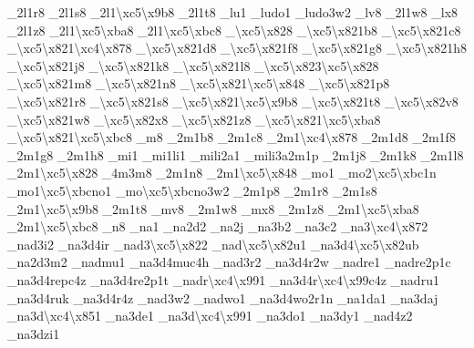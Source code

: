 {\-\_\-2l1r8 \-\_\-2l1s8 \-\_\-2l1\textbackslash{}xc5\textbackslash{}x9b8 \-\_\-2l1t8 \-\_\-lu1 \-\_\-ludo1 \-\_\-ludo3w2 \-\_\-lv8 \-\_\-2l1w8 \-\_\-lx8 \-\_\-2l1z8 \-\_\-2l1\textbackslash{}xc5\textbackslash{}xba8 \-\_\-2l1\textbackslash{}xc5\textbackslash{}xbc8 \-\_\-\textbackslash{}xc5\textbackslash{}x828 \-\_\textbackslash{}xc5\textbackslash{}x821b8 \-\_\textbackslash{}xc5\textbackslash{}x821c8 \-\_\textbackslash{}xc5\textbackslash{}x821\textbackslash{}xc4\textbackslash{}x878 \-\_\textbackslash{}xc5\textbackslash{}x821d8 \-\_\textbackslash{}xc5\textbackslash{}x821f8 \-\_\textbackslash{}xc5\textbackslash{}x821g8 \-\_\textbackslash{}xc5\textbackslash{}x821h8 \-\_\textbackslash{}xc5\textbackslash{}x821j8 \-\_\textbackslash{}xc5\textbackslash{}x821k8 \-\_\textbackslash{}xc5\textbackslash{}x821l8 \-\_\textbackslash{}xc5\textbackslash{}x823\textbackslash{}xc5\textbackslash{}x828 \-\_\textbackslash{}xc5\textbackslash{}x821m8 \-\_\textbackslash{}xc5\textbackslash{}x821n8 \-\_\textbackslash{}xc5\textbackslash{}x821\textbackslash{}xc5\textbackslash{}x848 \-\_\textbackslash{}xc5\textbackslash{}x821p8 \-\_\textbackslash{}xc5\textbackslash{}x821r8 \-\_\textbackslash{}xc5\textbackslash{}x821s8 \-\_\textbackslash{}xc5\textbackslash{}x821\textbackslash{}xc5\textbackslash{}x9b8 \-\_\textbackslash{}xc5\textbackslash{}x821t8 \-\_\-\textbackslash{}xc5\textbackslash{}x82v8 \-\_\textbackslash{}xc5\textbackslash{}x821w8 \-\_\-\textbackslash{}xc5\textbackslash{}x82x8 \-\_\textbackslash{}xc5\textbackslash{}x821z8 \-\_\textbackslash{}xc5\textbackslash{}x821\textbackslash{}xc5\textbackslash{}xba8 \-\_\textbackslash{}xc5\textbackslash{}x821\textbackslash{}xc5\textbackslash{}xbc8 \-\_\-m8 \-\_\-2m1b8 \-\_\-2m1c8 \-\_\-2m1\textbackslash{}xc4\textbackslash{}x878 \-\_\-2m1d8 \-\_\-2m1f8 \-\_\-2m1g8 \-\_\-2m1h8 \-\_\-mi1 \-\_\-mi1li1 \-\_\-mili2a1 \-\_\-mili3a2m1p \-\_\-2m1j8 \-\_\-2m1k8 \-\_\-2m1l8 \-\_\-2m1\textbackslash{}xc5\textbackslash{}x828 \-\_\-4m3m8 \-\_\-2m1n8 \-\_\-2m1\textbackslash{}xc5\textbackslash{}x848 \-\_\-mo1 \-\_\-mo2\textbackslash{}xc5\textbackslash{}xbc1n \-\_\-mo1\textbackslash{}xc5\textbackslash{}xbcno1 \-\_\-mo\textbackslash{}xc5\textbackslash{}xbcno3w2 \-\_\-2m1p8 \-\_\-2m1r8 \-\_\-2m1s8 \-\_\-2m1\textbackslash{}xc5\textbackslash{}x9b8 \-\_\-2m1t8 \-\_\-mv8 \-\_\-2m1w8 \-\_\-mx8 \-\_\-2m1z8 \-\_\-2m1\textbackslash{}xc5\textbackslash{}xba8 \-\_\-2m1\textbackslash{}xc5\textbackslash{}xbc8 \-\_\-n8 \-\_\-na1 \-\_\-na2d2 \-\_\-na2j \-\_\-na3b2 \-\_\-na3c2 \-\_\-na3\textbackslash{}xc4\textbackslash{}x872 \-\_\-nad3i2 \-\_\-na3d4ir \-\_\-nad3\textbackslash{}xc5\textbackslash{}x822 \-\_\-nad\textbackslash{}xc5\textbackslash{}x82u1 \-\_\-na3d4\textbackslash{}xc5\textbackslash{}x82ub \-\_\-na2d3m2 \-\_\-nadmu1 \-\_\-na3d4muc4h \-\_\-nad3r2 \-\_\-na3d4r2w \-\_\-nadre1 \-\_\-nadre2p1c \-\_\-na3d4repc4z \-\_\-na3d4re2p1t \-\_\-nadr\textbackslash{}xc4\textbackslash{}x991 \-\_\-na3d4r\textbackslash{}xc4\textbackslash{}x99c4z \-\_\-nadru1 \-\_\-na3d4ruk \-\_\-na3d4r4z \-\_\-nad3w2 \-\_\-nadwo1 \-\_\-na3d4wo2r1n \-\_\-na1da1 \-\_\-na3daj \-\_\-na3d\textbackslash{}xc4\textbackslash{}x851 \-\_\-na3de1 \-\_\-na3d\textbackslash{}xc4\textbackslash{}x991 \-\_\-na3do1 \-\_\-na3dy1 \-\_\-nad4z2 \-\_\-na3dzi1 }
